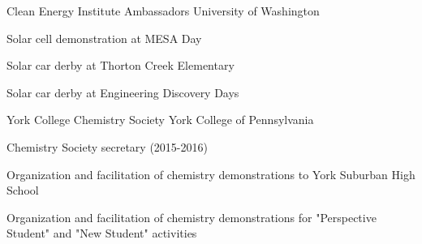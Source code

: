 

\begin{cventries}

\cventry
  {}
  {Clean Energy Institute Ambassadors} %
  {University of Washington} %
  {}
  {
    \begin{cvitems}
      \item{Solar cell demonstration at MESA Day}
      \item{Solar car derby at Thorton Creek Elementary}
      \item{Solar car derby at Engineering Discovery Days}
    \end{cvitems}
  }


\cventry
  {}
  {York College Chemistry Society} %
  {York College of Pennsylvania} %
  {}
  {
    \begin{cvitems}
      \item{Chemistry Society secretary (2015-2016)}
      \item{Organization and facilitation of chemistry demonstrations to York Suburban High School}
      \item{Organization and facilitation of chemistry demonstrations for "Perspective Student" and "New Student" activities}
    \end{cvitems}
  }



\end{cventries}
